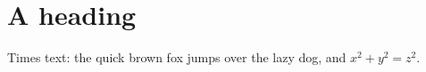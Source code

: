 \documentclass{article}
\begin{document}
\section{A heading}
Times text: the quick brown fox jumps over the lazy dog, and $x^2 + y^2 = z^2$.
\end{document}
